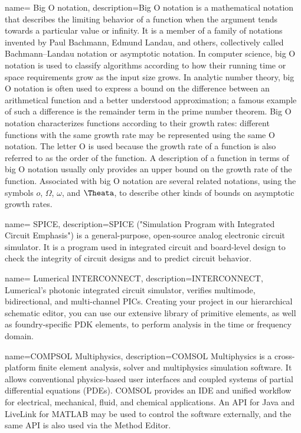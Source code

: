 {
        name= Big O notation,
        description={Big O notation is a mathematical notation that describes the limiting behavior of a function when the argument tends towards a particular value or infinity. It is a member of a family of notations invented by Paul Bachmann, Edmund Landau, and others, collectively called Bachmann–Landau notation or asymptotic notation. In computer science, big O notation is used to classify algorithms according to how their running time or space requirements grow as the input size grows. In analytic number theory, big O notation is often used to express a bound on the difference between an arithmetical function and a better understood approximation; a famous example of such a difference is the remainder term in the prime number theorem. Big O notation characterizes functions according to their growth rates: different functions with the same growth rate may be represented using the same O notation. The letter O is used because the growth rate of a function is also referred to as the order of the function. A description of a function in terms of big O notation usually only provides an upper bound on the growth rate of the function. Associated with big O notation are several related notations, using the symbols $o$, $\Omega$, $\omega$, and $\Theata$, to describe other kinds of bounds on asymptotic growth rates.}
}

{
        name= SPICE,
        description={SPICE ("Simulation Program with Integrated Circuit Emphasis") is a general-purpose, open-source analog electronic circuit simulator. It is a program used in integrated circuit and board-level design to check the integrity of circuit designs and to predict circuit behavior.}
}

{
        name= Lumerical INTERCONNECT,
        description={INTERCONNECT, Lumerical’s photonic integrated circuit simulator, verifies multimode, bidirectional, and multi-channel PICs. Creating your project in our hierarchical schematic editor, you can use our extensive library of primitive elements, as well as foundry-specific PDK elements, to perform analysis in the time or frequency domain.}
}

{
        name=COMPSOL Multiphysics,
        description={COMSOL Multiphysics is a cross-platform finite element analysis, solver and multiphysics simulation software. It allows conventional physics-based user interfaces and coupled systems of partial differential equations (PDEs). COMSOL provides an IDE and unified workflow for electrical, mechanical, fluid, and chemical applications. An API for Java and LiveLink for MATLAB may be used to control the software externally, and the same API is also used via the Method Editor.}
}

